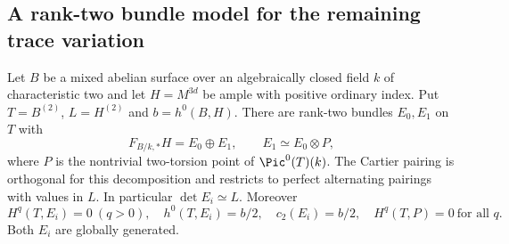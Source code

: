 \subsection{A rank-two bundle model for the remaining trace variation}

\begin{lemma}
\label{lem:DE-A3-positive-two-bundles}
Let $B$ be a mixed abelian surface over an algebraically closed
field $k$ of characteristic two and let
$H=M^{3d}$ be ample with positive ordinary index. Put
$T=B^{(2)}$, $L=H^{(2)}$ and $b=h^0(B,H)$.
There are rank-two bundles $E_0,E_1$ on $T$ with
\[
 F_{B/k,*}H=E_0\oplus E_1,\qquad
 E_1\simeq E_0\otimes P,
\]
where $P$ is the nontrivial two-torsion point of $\Pic^0(T)(k)$.
The Cartier pairing is orthogonal for this decomposition and
restricts to perfect alternating pairings with values in $L$.
In particular $\det E_i\simeq L$. Moreover
\[
 H^q(T,E_i)=0\ (q>0),\quad h^0(T,E_i)=b/2,\quad
 c_2(E_i)=b/2,\quad H^q(T,P)=0\ \text{for all }q.
\]
Both $E_i$ are globally generated.
\end{lemma}

